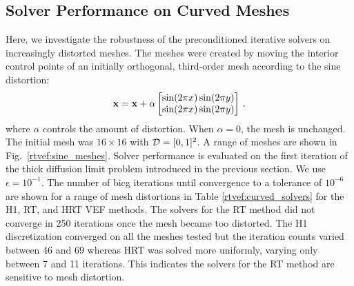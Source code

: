 \documentclass[../doc.tex]{subfiles}
\begin{document}
\subsection{Solver Performance on Curved Meshes}
Here, we investigate the robustness of the preconditioned iterative solvers on increasingly distorted meshes. The meshes were created by moving the interior control points of an initially orthogonal, third-order mesh according to the sine distortion: 
	\begin{equation}
		\boldsymbol{\mathrm{x}} = \boldsymbol{\mathrm{x}} + \alpha\begin{bmatrix} 
			\sin(2\pi x) \sin(2\pi y)\\
			\sin(2\pi x) \sin(2\pi y)
		\end{bmatrix} \,,
	\end{equation}
where $\alpha$ controls the amount of distortion. When $\alpha=0$, the mesh is unchanged. The initial mesh was $16\times 16$ with $\mathcal{D} = [0,1]^2$. A range of meshes are shown in Fig.~\ref{rtvef:sine_meshes}. Solver performance is evaluated on the first iteration of the thick diffusion limit problem introduced in the previous section. We use $\epsilon = 10^{-1}$. The number of \gls{bicg} iterations until convergence to a tolerance of $10^{-6}$ are shown for a range of mesh distortions in Table \ref{rtvef:curved_solvers} for the H1, RT, and HRT VEF methods. The solvers for the RT method did not converge in 250 iterations once the mesh became too distorted. The H1 discretization converged on all the meshes tested but the iteration counts varied between 46 and 69 whereas HRT was solved more uniformly, varying only between 7 and 11 iterations. This indicates the solvers for the RT method are sensitive to mesh distortion. 
\end{document}

